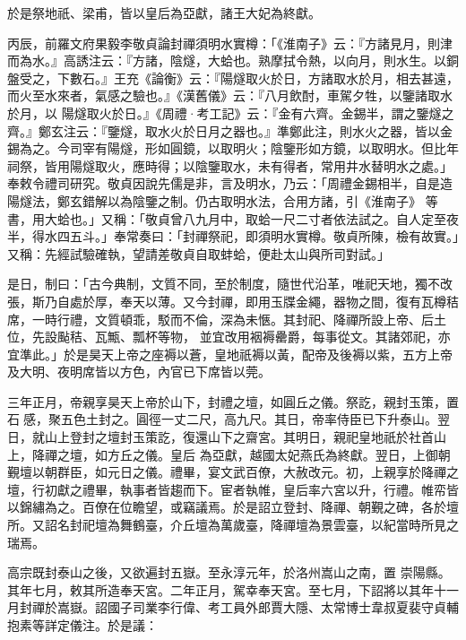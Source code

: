 \begin{pinyinscope}
 於是祭地祇、梁甫，皆以皇后為亞獻，諸王大妃為終獻。



 丙辰，前羅文府果毅李敬貞論封禪須明水實樽：「《淮南子》云：『方諸見月，則津而為水。』高誘注云：『方諸，陰燧，大蛤也。熟摩拭令熱，以向月，則水生。以銅盤受之，下數石。』王充《論衡》云：『陽燧取火於日，方諸取水於月，相去甚遠，而火至水來者，氣感之驗也。』《漢舊儀》云：『八月飲酎，車駕夕牲，以鑒諸取水於月，以
 陽燧取火於日。』《周禮·考工記》云：『金有六齊。金錫半，謂之鑒燧之齊。』鄭玄注云：『鑒燧，取水火於日月之器也。』準鄭此注，則水火之器，皆以金錫為之。今司宰有陽燧，形如圓鏡，以取明火；陰鑒形如方鏡，以取明水。但比年祠祭，皆用陽燧取火，應時得；以陰鑒取水，未有得者，常用井水替明水之處。」奉敕令禮司研究。敬貞因說先儒是非，言及明水，乃云：「周禮金錫相半，自是造陽燧法，鄭玄錯解以為陰鑒之制。仍古取明水法，合用方諸，引《淮南子》
 等書，用大蛤也。」又稱：「敬貞曾八九月中，取蛤一尺二寸者依法試之。自人定至夜半，得水四五斗。」奉常奏曰：「封禪祭祀，即須明水實樽。敬貞所陳，檢有故實。」又稱：先經試驗確執，望請差敬貞自取蚌蛤，便赴太山與所司對試。」



 是日，制曰：「古今典制，文質不同，至於制度，隨世代沿革，唯祀天地，獨不改張，斯乃自處於厚，奉天以薄。又今封禪，即用玉牒金繩，器物之間，復有瓦樽秸席，一時行禮，文質頓乖，駁而不倫，深為未愜。其封祀、降禪所設上帝、后土位，先設颭秸、瓦甒、瓢杯等物，
 並宜改用裀褥罍爵，每事從文。其諸郊祀，亦宜準此。」於是昊天上帝之座褥以蒼，皇地祇褥以黃，配帝及後褥以紫，五方上帝及大明、夜明席皆以方色，內官已下席皆以莞。



 三年正月，帝親享昊天上帝於山下，封禮之壇，如圓丘之儀。祭訖，親封玉策，置石感，聚五色土封之。圓徑一丈二尺，高九尺。其日，帝率侍臣已下升泰山。翌日，就山上登封之壇封玉策訖，復還山下之齋宮。其明日，親祀皇地祇於社首山上，降禪之壇，如方丘之儀。皇后
 為亞獻，越國太妃燕氏為終獻。翌日，上御朝覲壇以朝群臣，如元日之儀。禮畢，宴文武百僚，大赦改元。初，上親享於降禪之壇，行初獻之禮畢，執事者皆趨而下。宦者執帷，皇后率六宮以升，行禮。帷帟皆以錦繡為之。百僚在位瞻望，或竊議焉。於是詔立登封、降禪、朝覲之碑，各於壇所。又詔名封祀壇為舞鶴臺，介丘壇為萬歲臺，降禪壇為景雲臺，以紀當時所見之瑞焉。



 高宗既封泰山之後，又欲遍封五嶽。至永淳元年，於洛州嵩山之南，置
 崇陽縣。其年七月，敕其所造奉天宮。二年正月，駕幸奉天宮。至七月，下詔將以其年十一月封禪於嵩嶽。詔國子司業李行偉、考工員外郎賈大隱、太常博士韋叔夏裴守貞輔抱素等詳定儀注。於是議：




\end{pinyinscope}
